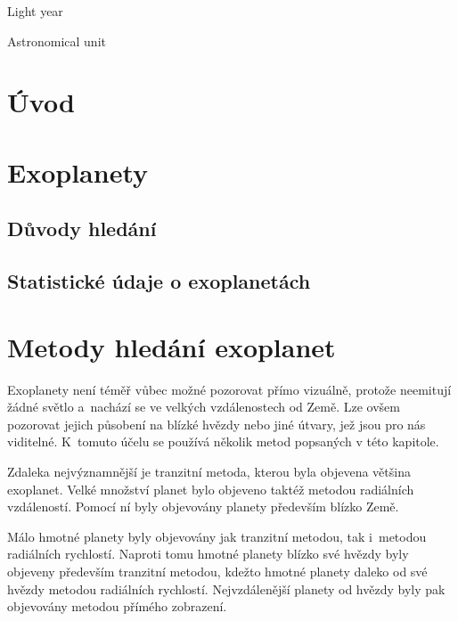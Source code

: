 \documentclass[a4paper,12pt]{article}
\begin{document}
\deskpage
\mainpage
\assignment
\statement
\acknowledgment
\annotationcs	
\annotationen
\content
\imglist
\tablelist
\codelist
\formulalist
\shortlist

\begin{description}[font=\mdseries,leftmargin=6em,labelwidth=!,]
\item[ly]		Light year
\item[AU]		Astronomical unit
\end{description}

\clearpage\pagestyle{plain}
\section*{Úvod}
\label{uvod}

\section{Exoplanety}
\subsection{Důvody hledání}

\subsection{Statistické údaje o exoplanetách}

\section{Metody hledání exoplanet}

Exoplanety není téměř vůbec možné pozorovat přímo vizuálně, protože neemitují žádné světlo a~nachází se ve velkých vzdálenostech od Země. Lze ovšem pozorovat jejich působení na blízké hvězdy nebo jiné útvary, jež jsou pro nás viditelné. K~tomuto účelu se používá několik metod popsaných v této kapitole.

Zdaleka nejvýznamnější je tranzitní metoda, kterou byla objevena většina exoplanet. Velké množství planet bylo objeveno taktéž metodou radiálních vzdáleností. Pomocí ní byly objevovány planety především blízko Země.


\dataplot

Málo hmotné planety byly objevovány jak tranzitní metodou, tak i~metodou radiálních rychlostí. Naproti tomu hmotné planety blízko své hvězdy byly objeveny především tranzitní metodou, kdežto hmotné planety daleko od své hvězdy metodou radiálních rychlostí. Nejvzdálenější planety od hvězdy byly pak objevovány metodou přímého zobrazení.
\end{document}
